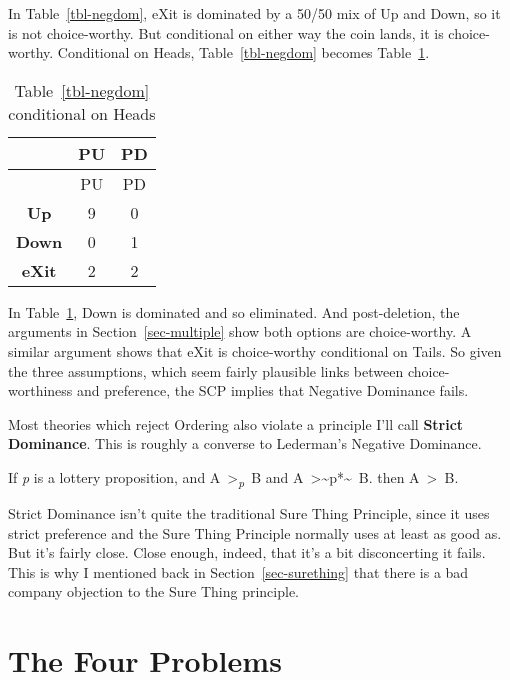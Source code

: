 \documentclass[
  10pt,
  letterpaper,
  DIV=11,
  numbers=noendperiod,
  twoside]{scrartcl}
\providecommand{\tightlist}{%
  \setlength{\itemsep}{0pt}\setlength{\parskip}{0pt}}\usepackage{longtable,booktabs,array}
\begin{document}
In Table~\ref{tbl-negdom}, eXit is dominated by a 50/50 mix of Up and
Down, so it is not choice-worthy. But conditional on either way the coin
lands, it is choice-worthy. Conditional on Heads, Table~\ref{tbl-negdom}
becomes Table~\ref{tbl-negdom-heads}.

\begin{longtable}[]{@{}ccc@{}}
\caption{Table~\ref{tbl-negdom} conditional on
Heads}\label{tbl-negdom-heads}\tabularnewline
\toprule\noalign{}
& PU & PD \\
\midrule\noalign{}
\endfirsthead
\toprule\noalign{}
& PU & PD \\
\midrule\noalign{}
\endhead
\bottomrule\noalign{}
\endlastfoot
\textbf{Up} & 9 & 0 \\
\textbf{Down} & 0 & 1 \\
\textbf{eXit} & 2 & 2 \\
\end{longtable}

In Table~\ref{tbl-negdom-heads}, Down is dominated and so eliminated.
And post-deletion, the arguments in Section~\ref{sec-multiple} show both
options are choice-worthy. A similar argument shows that eXit is
choice-worthy conditional on Tails. So given the three assumptions,
which seem fairly plausible links between choice-worthiness and
preference, the SCP implies that Negative Dominance fails.

Most theories which reject Ordering also violate a principle I'll call
\textbf{Strict Dominance}. This is roughly a converse to Lederman's
Negative Dominance.

\begin{description}
\tightlist
\item[Strict Dominance]
If \emph{p} is a lottery proposition, and
A~\textgreater{}\textsubscript{\emph{p}}~B and
A~\textgreater\textasciitilde{}\neg *p*\textasciitilde~B. then
A~\textgreater~B.
\end{description}

Strict Dominance isn't quite the traditional Sure Thing Principle, since
it uses strict preference and the Sure Thing Principle normally uses at
least as good as. But it's fairly close. Close enough, indeed, that it's
a bit disconcerting it fails. This is why I mentioned back in
Section~\ref{sec-surething} that there is a bad company objection to the
Sure Thing principle.

\section{The Four Problems}\label{the-four-problems}
\end{document}
